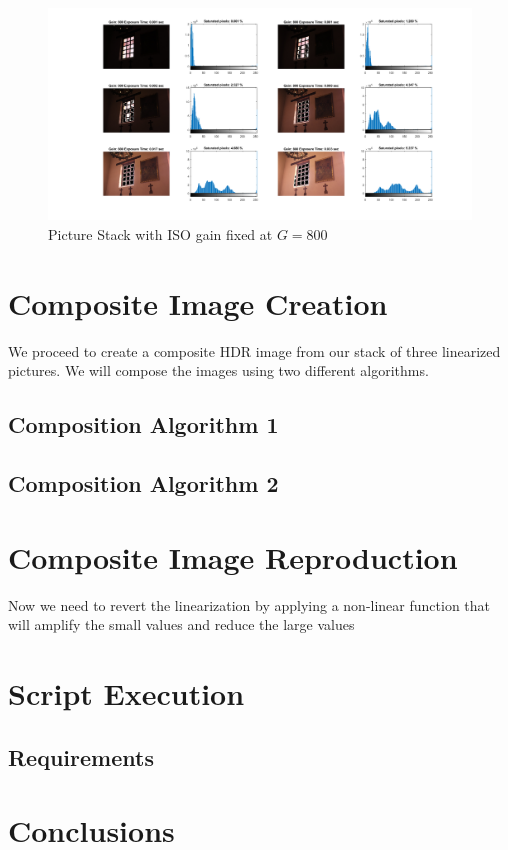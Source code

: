 \documentclass[a4paper]{article}
\begin{document}
\begin{figure}[H]
\centering
\includegraphics[trim=7cm 1cm 1cm 0cm clip, scale=.4]{Chapel_Histogram_set.png}
\caption{Picture Stack with ISO gain fixed at $G = 800$}
\label{fig:PicStack}
\end{figure}
\FloatBarrier
\section{Composite Image Creation}
We proceed to create a composite HDR image from our stack of three linearized pictures. We will compose the images using two different algorithms.

\subsection{Composition Algorithm 1}

\subsection{Composition Algorithm 2}
\section{Composite Image Reproduction}
Now we need to revert the linearization by applying a non-linear function that will amplify the small values and reduce the large values
\section{Script Execution}

\subsection{Requirements}
\section{Conclusions}


\end{document}
